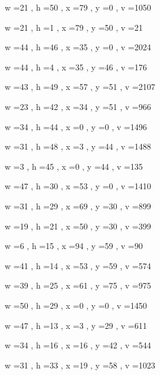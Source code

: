 \documentclass[11pt]{article}
\begin{document}
w =21 , h =50 , x =79 , y =0 , v =1050
\par
w =21 , h =1 , x =79 , y =50 , v =21
\par
w =44 , h =46 , x =35 , y =0 , v =2024
\par
w =44 , h =4 , x =35 , y =46 , v =176
\par
w =43 , h =49 , x =57 , y =51 , v =2107
\par
w =23 , h =42 , x =34 , y =51 , v =966
\par
w =34 , h =44 , x =0 , y =0 , v =1496
\par
w =31 , h =48 , x =3 , y =44 , v =1488
\par
w =3 , h =45 , x =0 , y =44 , v =135
\par
\newpage




w =47 , h =30 , x =53 , y =0 , v =1410
\par
w =31 , h =29 , x =69 , y =30 , v =899
\par
w =19 , h =21 , x =50 , y =30 , v =399
\par
w =6 , h =15 , x =94 , y =59 , v =90
\par
w =41 , h =14 , x =53 , y =59 , v =574
\par
w =39 , h =25 , x =61 , y =75 , v =975
\par
w =50 , h =29 , x =0 , y =0 , v =1450
\par
w =47 , h =13 , x =3 , y =29 , v =611
\par
w =34 , h =16 , x =16 , y =42 , v =544
\par
w =31 , h =33 , x =19 , y =58 , v =1023
\par
\newpage
\end{document}

